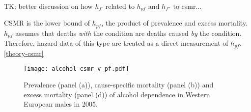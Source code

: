 TK: better discussion on how $h_{f'}$ related to $h_{pf}$ and $h_{f''}$ to csmr...

CSMR is the lower bound of $h_{pf}$, the product of prevalence and excess mortality.  $h_{pf}$ assumes that deaths \emph{with} the condition are deaths caused \emph{by} the condition.  Therefore, hazard data of this type are treated as a direct measurement of $h_{pf}$.  
\ref{theory-csmr}

    
    \begin{figure}[h]
        \begin{center}
            \texttt{[image: alcohol-csmr\_v\_pf.pdf]}
            \caption{Prevalence (panel (a)), cause-specific mortality (panel (b)) and excess mortality (panel (d)) of alcohol dependence in Western European males in 2005.}
            \label{fig:app-alcohol compare}
        \end{center}
    \end{figure} 